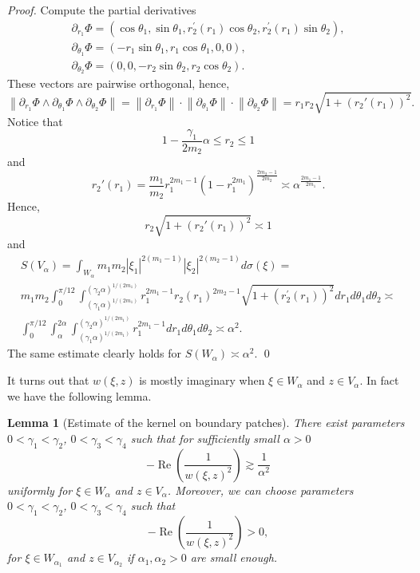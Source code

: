 \documentclass[review]{elsarticle}
\newtheorem{lem}[thm]{Lemma}
\newcommand{\abs}[1]{\left\vert #1 \right\vert}
\newcommand{\RE}{ \mathop{\mathrm{Re}} }
\begin{document}
\begin{proof}
		Compute the partial derivatives
		\begin{eqnarray}
				\partial_{r_1} \Phi=\left(\cos \theta_1, \sin \theta_1, r_2^{\prime}\left(r_1\right) \cos \theta_2, r_2^{\prime}\left(r_1\right) \sin \theta_2\right), \\
				\partial_{\theta_1} \Phi=\left(-r_1 \sin \theta_1, r_1 \cos \theta_1, 0,0\right), \\
				\partial_{\theta_2} \Phi=\left(0,0,-r_2 \sin \theta_2, r_2 \cos \theta_2\right) .
		\end{eqnarray}
		These vectors are pairwise orthogonal, hence, 
		$$\left\|\partial_{r_1} \Phi \wedge \partial_{\theta_1} \Phi \wedge \partial_{\theta_2} \Phi\right\| = \left\|\partial_{r_1} \Phi\right\| \cdot\left\|\partial_{\theta_1} \Phi\right\| \cdot\left\|\partial_{\theta_2} \Phi\right\| = r_1 r_2\sqrt{1+\left(r_2'(r_1)\right)^2}.
		$$
		Notice that
		$$  1- \frac{\gamma_1}{2m_2}\alpha \leq r_2 \leq 1$$
		and
		$$r_2'(r_1) = \frac{m_1}{m_2}r_1^{2m_1-1} \left(1-r_1^{2m_1}\right)^{\frac{2m_2-1}{2m_2}} \asymp \alpha^{\frac{2m_1-1}{2m_1}}.
		$$
		Hence,
		$$ r_2\sqrt{1+\left(r_2'(r_1)\right)^2} \asymp 1$$
		and
		\begin{multline*}
		S\left(V_\alpha\right)=\int_{W_\alpha} m_1m_2 \abs{\xi_1}^{2(m_1-1)}\abs{\xi_2}^{2(m_2-1)} d\sigma(\xi)=\\
		m_1m_2\int_0^{\pi/12} \int_{(\gamma_1 \alpha)^{1/(2m_1)}}^{(\gamma_2 \alpha)^{1/(2m_1)}}
		r_1^{2m_1-1} r_2\left(r_1\right)^{2m_2-1} \sqrt{1+\left(r_2^{\prime}\left(r_1\right)\right)^2} d r_1 d \theta_1 d \theta_2 \asymp\\ \int_0^{\pi/12} \int_{\alpha}^{2 \alpha} \int_{(\gamma_1 \alpha)^{1/(2m_1)}}^{(\gamma_2 \alpha)^{1/(2m_1)}} r_1^{2m_1-1} d r_1 d \theta_1 d \theta_2 \asymp \alpha^{2}.
		\end{multline*}
		The same estimate clearly holds for $S(W_\alpha)\asymp \alpha^2.$		\qed
\end{proof}

It turns out that $w(\xi,z)$ is mostly imaginary when $\xi\in W_\alpha$ and $z\in V_\alpha.$ In fact we have the following lemma.

\begin{lem}[Estimate of the kernel on boundary patches] \label{lm:EstOfKernel}
	There exist parameters $0<\gamma_1<\gamma_2$, $0<\gamma_3<\gamma_4$ such that for sufficiently small $\alpha>0$ 
	\begin{equation}\label{lm:EstOfKernel_eq1}
		-\RE\left(\frac{1}{w(\xi,z)^2}\right) \gtrsim \frac{1}{\alpha^2}
	\end{equation}
	uniformly for $\xi\in W_\alpha$ and $z\in V_\alpha$. Moreover, we can choose parameters $0<\gamma_1<\gamma_2$, $0<\gamma_3<\gamma_4$ such that
	\begin{equation}\label{lm:EstOfKernel_eq2}
		-\RE\left(\frac{1}{w(\xi,z)^2}\right) > 0 , 
	\end{equation}
	for $\xi\in W_{\alpha_1}$ and $z\in V_{\alpha_2}$ if $\alpha_1, \alpha_2>0$ are small enough.
\end{lem}
\end{document}
